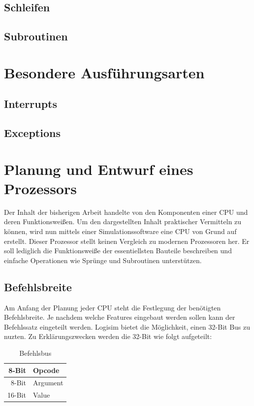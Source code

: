 \documentclass[12pt]{article}
\begin{document}
\subsection{Schleifen}
\subsection{Subroutinen}

\section{Besondere Ausführungsarten}
\subsection{Interrupts}
\subsection{Exceptions}


\newpage

\section{Planung und Entwurf eines Prozessors}
Der Inhalt der bisherigen Arbeit handelte von den Komponenten einer CPU und deren Funktionsweißen. Um den dargestellten Inhalt praktischer Vermitteln zu können, wird nun mittels einer Simulationssoftware eine CPU von Grund auf erstellt. Dieser Prozessor stellt keinen Vergleich zu modernen Prozessoren her. Er soll lediglich die Funktionsweiße der essentiellsten Bauteile beschreiben und einfache Operationen wie Sprünge und Subroutinen unterstützen.
\subsection{Befehlsbreite}
Am Anfang der Planung jeder CPU steht die Festlegung der benötigten Befehlsbreite. Je nachdem welche Features eingebaut werden sollen kann der Befehlssatz eingeteilt werden. Logisim bietet die Möglichkeit, einen 32-Bit Bus zu nuzten. Zu Erklärungszwecken werden die 32-Bit wie folgt aufgeteilt:

\begin{table}[!htb]
\centering
\caption{Befehlsbus}
\label{Befehlsbus}
\begin{tabular}{|r|l|}
  \hline
  8-Bit & Opcode \\
  \hline
  8-Bit & Argument \\ 
  \hline
  16-Bit & Value\\
  \hline
  
\end{tabular}
\end{table}
\end{document}
